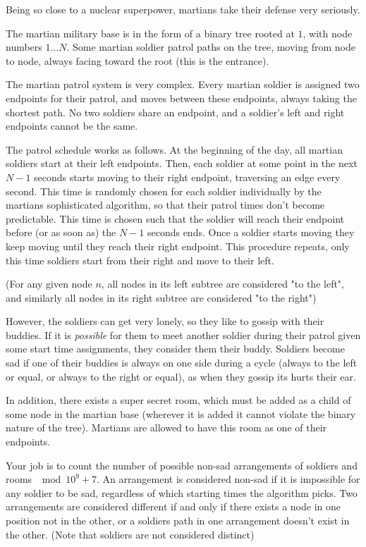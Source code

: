 
Being so close to a nuclear superpower, martians take their defense very seriously.

The martian military base is in the form of a binary tree rooted at $1$, with node numbers $1 \dots N$. Some martian soldier patrol paths on the tree, moving from node to node, always facing toward the root (this is the entrance). 

The martian patrol system is very complex. Every martian soldier is assigned two endpoints for their patrol, and moves between these endpoints, always taking the shortest path. No two soldiers share an endpoint, and a soldier's left and right endpoints cannot be the same.

The patrol schedule works as follows. At the beginning of the day, all martian soldiers start at their left endpoints. Then, each soldier at some point in the next $N-1$ seconds starts moving to their right endpoint, traversing an edge every second. This time is randomly chosen for each soldier individually by the martians sophisticated algorithm, so that their patrol times don't become predictable. This time is chosen such that the soldier will reach their endpoint before (or as soon as) the $N-1$ seconds ends. Once a soldier starts moving they keep moving until they reach their right endpoint. This procedure repeats, only this time soldiers start from their right and move to their left.

(For any given node $n$, all nodes in its left subtree are considered "to the left", and similarly all nodes in its right subtree are considered "to the right")

However, the soldiers can get very lonely, so they like to gossip with their buddies. If it is \emph{possible} for them to meet another soldier during their patrol given some start time assignments, they consider them their buddy. Soldiers become sad if one of their buddies is always on one side during a cycle (always to the left or equal, or always to the right or equal), as when they gossip its hurts their ear. 

In addition, there exists a super secret room, which must be added as a child of some node in the martian base (wherever it is added it cannot violate the binary nature of the tree). Martians are allowed to have this room as one of their endpoints.

Your job is to count the number of possible non-sad arrangements of soldiers and rooms $\mod 10^9 + 7$. An arrangement is considered non-sad if it is impossible for any soldier to be sad, regardless of which starting times the algorithm picks. Two arrangements are considered different if and only if there exists a node in one position not in the other, or a soldiers path in one arrangement doesn't exist in the other. (Note that soldiers are not considered distinct)

